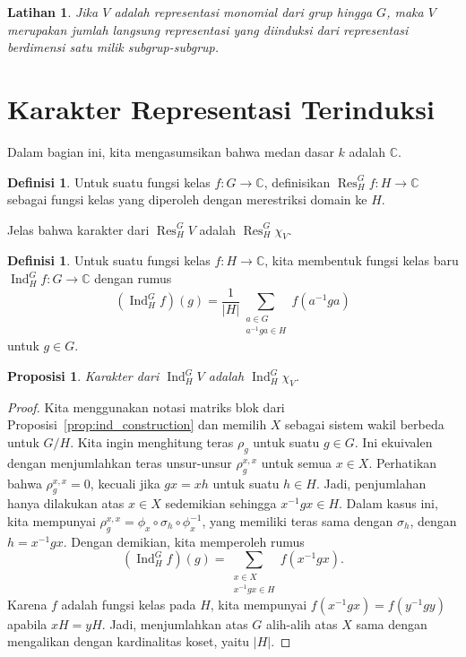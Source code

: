 \documentclass[12pt]{article}
\theoremstyle{plain}
\newtheorem{proposition}[theorem]{Proposisi}
\newtheorem{exercise}[theorem]{Latihan}
\theoremstyle{definition}
\newtheorem{definition}[theorem]{Definisi}
\theoremstyle{remark}
\numberwithin{equation}{section}
\begin{document}
\begin{exercise}
Jika $V$ adalah representasi monomial dari grup hingga $G$,
maka $V$ merupakan jumlah langsung representasi yang diinduksi dari representasi
berdimensi satu milik subgrup-subgrup.
\end{exercise}

\section{Karakter Representasi Terinduksi}

Dalam bagian ini, kita mengasumsikan bahwa medan dasar $k$ adalah $\mathbb{C}$.

\begin{definition}
Untuk suatu fungsi kelas $f : G \to \mathbb{C}$, definisikan
$\operatorname{Res}_H^G f : H \to \mathbb{C}$ sebagai
fungsi kelas yang diperoleh dengan merestriksi domain ke $H$.
\end{definition}

Jelas bahwa karakter dari $\operatorname{Res}_H^G V$
adalah $\operatorname{Res}_H^G \chi_V$.

\begin{definition}
Untuk suatu fungsi kelas $f : H \to \mathbb{C}$, kita membentuk fungsi kelas
baru $\operatorname{Ind}_H^G f : G \to \mathbb{C}$ dengan rumus
\[
(\operatorname{Ind}_H^G f)(g) =
\frac{1}{|H|}\sum_{\substack{a \in G\\a^{-1}ga \in H}} f(a^{-1}ga)
\]
untuk $g \in G$.
\end{definition}

\begin{proposition}
Karakter dari $\operatorname{Ind}_H^G V$
adalah $\operatorname{Ind}_H^G \chi_V$.
\end{proposition}

\begin{proof}
Kita menggunakan notasi matriks blok dari
Proposisi~\ref{prop:ind_construction}
dan memilih $X$ sebagai sistem wakil berbeda untuk $G/H$.
Kita ingin menghitung teras $\rho_g$ untuk suatu $g \in G$.
Ini ekuivalen dengan menjumlahkan teras unsur-unsur
$\rho_g^{x,x}$ untuk semua $x \in X$.
Perhatikan bahwa $\rho_g^{x,x} = 0$, kecuali jika $gx=xh$ untuk suatu
$h \in H$.
Jadi, penjumlahan hanya dilakukan atas $x \in X$ sedemikian sehingga
$x^{-1}gx \in H$. Dalam kasus ini, kita mempunyai
$\rho_g^{x,x}=\phi_x \circ \sigma_h \circ \phi_x^{-1}$,
yang memiliki teras sama dengan $\sigma_h$, dengan $h=x^{-1}gx$.
Dengan demikian, kita memperoleh rumus
\[
(\operatorname{Ind}_H^G f)(g) =
\sum_{\substack{x \in X\\x^{-1}gx \in H}} f(x^{-1}gx) .
\]
Karena $f$ adalah fungsi kelas pada $H$,
kita mempunyai $f(x^{-1}gx)=f(y^{-1}gy)$ apabila $xH=yH$.
Jadi, menjumlahkan atas $G$ alih-alih atas $X$ sama dengan
mengalikan dengan kardinalitas koset, yaitu $|H|$.
\end{proof}
\end{document}
